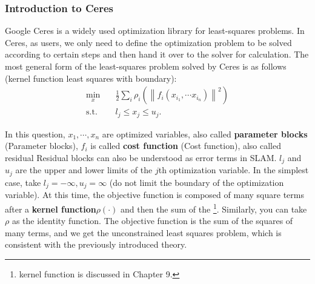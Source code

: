 \subsubsection{Introduction to Ceres}
Google Ceres is a widely used optimization library for least-squares problems. In Ceres, as users, we only need to define the optimization problem to be solved according to certain steps and then hand it over to the solver for calculation. The most general form of the least-squares problem solved by Ceres is as follows (kernel function least squares with boundary):
\begin{equation}
    \begin{array}{ll}
        \min \limits_x \quad & \frac{1}{2}\sum\limits_i {{\rho _i}\left( {{{\left\| {{f_i}\left( {{x_{{i_1}}}, \cdots {x_{{i_n}}}} \right)} \right\|}^2}} \right)} \\
        \mathrm{s.t.} \quad & {l_j} \leqslant {x_j} \leqslant {u_j}.
    \end{array}
\end{equation}

In this question, $x_1, \cdots, x_n$ are optimized variables, also called \textbf{parameter blocks} (Parameter blocks), $f_i$ is called \textbf{cost function} (Cost function), also called residual Residual blocks can also be understood as error terms in SLAM. $l_j$ and $u_j$ are the upper and lower limits of the $j$th optimization variable. In the simplest case, take $l_j = -\infty, u_j=\infty$ (do not limit the boundary of the optimization variable). At this time, the objective function is composed of many square terms after a \textbf{kernel function}$\rho(\cdot)$ and then the sum of the \footnote{kernel function is discussed in Chapter 9. }. Similarly, you can take $\rho$ as the identity function. The objective function is the sum of the squares of many terms, and we get the unconstrained least squares problem, which is consistent with the previously introduced theory.

